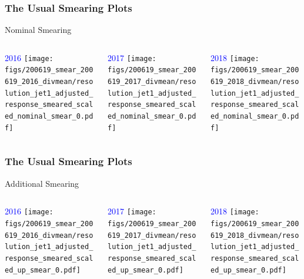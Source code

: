 \documentclass{beamer}
\begin{document}
\begin{frame}
  \frametitle{The Usual Smearing Plots}

  \vfill
  \centering
  Nominal Smearing
  \vfill

  \begin{columns}
    \begin{column}{0.33\linewidth}
      \centering
      \textcolor{blue}{2016}
      \texttt{[image: figs/200619\_smear\_200619\_2016\_divmean/resolution\_jet1\_adjusted\_response\_smeared\_scaled\_nominal\_smear\_0.pdf]}
    \end{column}
    \begin{column}{0.34\linewidth}
      \centering
      \textcolor{blue}{2017}
      \texttt{[image: figs/200619\_smear\_200619\_2017\_divmean/resolution\_jet1\_adjusted\_response\_smeared\_scaled\_nominal\_smear\_0.pdf]}
    \end{column}
    \begin{column}{0.33\linewidth}
      \centering
      \textcolor{blue}{2018}
      \texttt{[image: figs/200619\_smear\_200619\_2018\_divmean/resolution\_jet1\_adjusted\_response\_smeared\_scaled\_nominal\_smear\_0.pdf]}
    \end{column}
  \end{columns}

\end{frame}

\begin{frame}
  \frametitle{The Usual Smearing Plots}

  \vfill
  \centering
  Additional Smearing
  \vfill

  \begin{columns}
    \begin{column}{0.33\linewidth}
      \centering
      \textcolor{blue}{2016}
      \texttt{[image: figs/200619\_smear\_200619\_2016\_divmean/resolution\_jet1\_adjusted\_response\_smeared\_scaled\_up\_smear\_0.pdf]}
    \end{column}
    \begin{column}{0.34\linewidth}
      \centering
      \textcolor{blue}{2017}
      \texttt{[image: figs/200619\_smear\_200619\_2017\_divmean/resolution\_jet1\_adjusted\_response\_smeared\_scaled\_up\_smear\_0.pdf]}
    \end{column}
    \begin{column}{0.33\linewidth}
      \centering
      \textcolor{blue}{2018}
      \texttt{[image: figs/200619\_smear\_200619\_2018\_divmean/resolution\_jet1\_adjusted\_response\_smeared\_scaled\_up\_smear\_0.pdf]}
    \end{column}
  \end{columns}

\end{frame}
\end{document}
